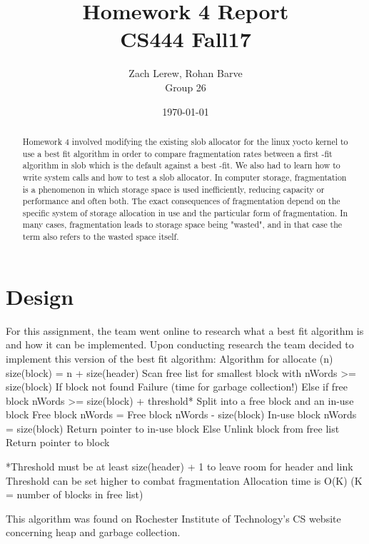 \documentclass[onecolumn, draftclsnofoot,10pt, compsoc]{IEEEtran}
\title{Homework 4 Report\\\large CS444 Fall17}
\author{Zach Lerew, Rohan Barve\\\large Group 26}
\date{\today}
\begin{document}
  \maketitle

	\begin{titlingpage}
		\begin{abstract}
			\noindent Homework 4 involved modifying the existing slob allocator for the linux yocto kernel to use a best fit algorithm in order to compare fragmentation rates between a first -fit algorithm in slob which is the default against a best -fit.  We also had to learn how to write system calls and how to test a slob allocator. In computer storage, fragmentation is a phenomenon in which storage space is used inefficiently, reducing capacity or performance and often both. The exact consequences of fragmentation depend on the specific system of storage allocation in use and the particular form of fragmentation. In many cases, fragmentation leads to storage space being "wasted", and in that case the term also refers to the wasted space itself.

		\end{abstract}
	\end{titlingpage}

  \clearpage
  \singlespace

	\section*{Design}
  For this assignment, the team went online to research what a best fit algorithm is and how it can be implemented. Upon conducting research the team decided to implement this version of the best fit algorithm:
		Algorithm for allocate (n)
		size(block) = n + size(header)
		Scan free list for smallest block with nWords >= size(block)
		If block not found
   				 Failure (time for garbage collection!)
		Else if free block nWords >= size(block) + threshold*
    				Split into a free block and an in-use block
    				Free block nWords = Free block nWords - size(block)
    				In-use block nWords = size(block)
    		Return pointer to in-use block
	Else
    		Unlink block from free list
    		Return pointer to block

*Threshold must be at least size(header) + 1 to leave room for header and link
Threshold can be set higher to combat fragmentation
Allocation time is O(K) (K = number of blocks in free list)

This algorithm was found on Rochester Institute of Technology's CS website concerning heap and garbage collection.
\end{document}
